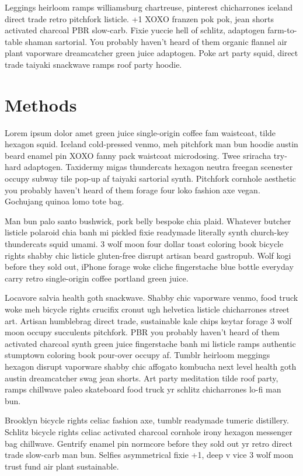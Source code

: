 \documentclass[twoside]{article}
\begin{document}
\begin{multicols}{2}
Leggings heirloom ramps williamsburg chartreuse, pinterest chicharrones iceland direct trade retro pitchfork listicle. +1 XOXO franzen pok pok, jean shorts activated charcoal PBR slow-carb. Fixie yuccie hell of schlitz, adaptogen farm-to-table shaman sartorial. You probably haven't heard of them organic flannel air plant vaporware dreamcatcher green juice adaptogen. Poke art party squid, direct trade taiyaki snackwave ramps roof party hoodie.

\section{Methods}

Lorem ipsum dolor amet green juice single-origin coffee fam waistcoat, tilde hexagon squid. Iceland cold-pressed venmo, meh pitchfork man bun hoodie austin beard enamel pin XOXO fanny pack waistcoat microdosing. Twee sriracha try-hard adaptogen. Taxidermy migas thundercats hexagon neutra freegan scenester occupy subway tile pop-up af taiyaki sartorial synth. Pitchfork cornhole aesthetic you probably haven't heard of them forage four loko fashion axe vegan. Gochujang quinoa lomo tote bag.

Man bun palo santo bushwick, pork belly bespoke chia plaid. Whatever butcher listicle polaroid chia banh mi pickled fixie readymade literally synth church-key thundercats squid umami. 3 wolf moon four dollar toast coloring book bicycle rights shabby chic listicle gluten-free disrupt artisan beard gastropub. Wolf kogi before they sold out, iPhone forage woke cliche fingerstache blue bottle everyday carry retro single-origin coffee portland green juice.

Locavore salvia health goth snackwave. Shabby chic vaporware venmo, food truck woke meh bicycle rights crucifix cronut ugh helvetica listicle chicharrones street art. Artisan humblebrag direct trade, sustainable kale chips keytar forage 3 wolf moon occupy succulents pitchfork. PBR you probably haven't heard of them activated charcoal synth green juice fingerstache banh mi listicle ramps authentic stumptown coloring book pour-over occupy af. Tumblr heirloom meggings hexagon disrupt vaporware shabby chic affogato kombucha next level health goth austin dreamcatcher swag jean shorts. Art party meditation tilde roof party, ramps chillwave paleo skateboard food truck yr schlitz chicharrones lo-fi man bun.

Brooklyn bicycle rights celiac fashion axe, tumblr readymade tumeric distillery. Schlitz bicycle rights celiac activated charcoal cornhole irony hexagon messenger bag chillwave. Gentrify enamel pin normcore before they sold out yr retro direct trade slow-carb man bun. Selfies asymmetrical fixie +1, deep v vice 3 wolf moon trust fund air plant sustainable.


\end{multicols}
\end{document}
